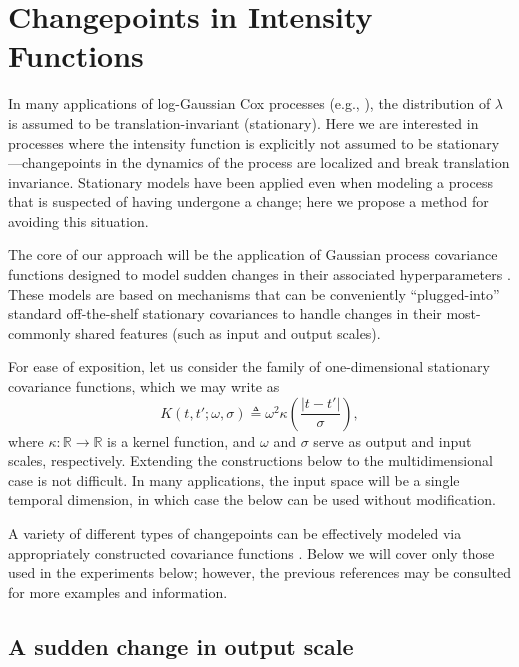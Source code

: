 \documentclass{article}
\newcommand{\deq}{\triangleq}
\newcommand{\R}{\mathbb{R}}
\begin{document}
\section{Changepoints in Intensity Functions}
\label{changepoints}

In many applications of log-Gaussian Cox processes (e.g.,
\citep{moller, diggle, adams}), the distribution of $\lambda$ is
assumed to be translation-invariant (stationary).  Here we are
interested in processes where the intensity function is explicitly not
assumed to be stationary---changepoints in the dynamics of the process
are localized and break translation invariance.  Stationary models
have been applied \citep{adams} even when modeling a process that is
suspected of having undergone a change; here we propose a method for
avoiding this situation.

The core of our approach will be the application of Gaussian process
covariance functions designed to model sudden changes in their
associated hyperparameters \citep{cpcj}.  These models are based on
mechanisms that can be conveniently ``plugged-into'' standard
off-the-shelf stationary covariances to handle changes in their
most-commonly shared features (such as input and output scales).

For ease of exposition, let us consider the family of one-dimensional
stationary covariance functions, which we may write as
\begin{equation*}
  K(t, t'; \omega, \sigma)
  \deq
  \omega^2
  \kappa\left( \frac{\lvert t - t' \rvert}{\sigma} \right),
\end{equation*}
where $\kappa\colon \R \to \R$ is a kernel function, and $\omega$ and
$\sigma$ serve as output and input scales, respectively.  Extending
the constructions below to the multidimensional case is not difficult.
In many applications, the input space will be a single temporal
dimension, in which case the below can be used without modification.

A variety of different types of changepoints can be effectively
modeled via appropriately constructed covariance functions
\citep{cpcj, thesis}.  Below we will cover only those used in the
experiments below; however, the previous references may be consulted
for more examples and information.

\subsection{A sudden change in output scale}
\end{document}
